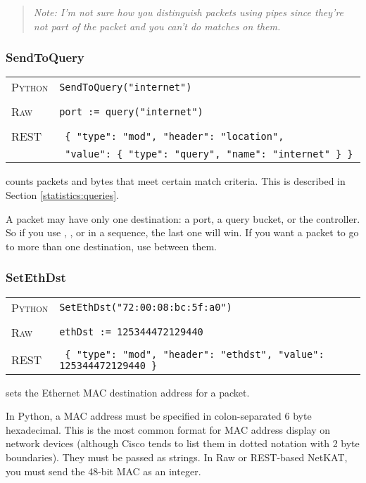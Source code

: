 \begin{quotation}
\emph{Note: I'm not sure how you distinguish packets using pipes since they're not part of the 
packet and you can't do matches on them.}
\end{quotation}

\subsubsection{SendToQuery}

\bigskip
\begin{tabularx}{\linewidth}{lX}
\textsc{Python}   & \texttt{SendToQuery("internet")} \\ \\
\textsc{Raw}    & \texttt{port := query("internet")}     \\ \\
\textsc{REST} & \texttt{ \{ "type": "mod", "header": "location", } \\
 & \texttt{ "value": \{ "type": "query", "name": "internet" \} \} } 
\end{tabularx}

 counts packets and bytes that meet certain match criteria.  This is described in
Section \ref{statistics:queries}.   

A packet may have only one destination: a port, a query bucket, or the controller.  So if you use 
, , or  in a sequence, the last one will
win.  If you want a packet to go to more than one destination, use  between them.    

\subsubsection{SetEthDst}

\bigskip
\begin{tabularx}{\linewidth}{lX}
\textsc{Python}   & \texttt{SetEthDst("72:00:08:bc:5f:a0")} \\ \\
\textsc{Raw}    & \texttt{ethDst := 125344472129440}     \\ \\
\textsc{REST} & \texttt{ \{ "type": "mod", "header": "ethdst", "value": 125344472129440 \} }
\end{tabularx}

 sets the Ethernet MAC destination address for a packet.    

In Python, a MAC address must be specified in colon-separated 6 byte hexadecimal.  This is the most common format
for MAC address display on network devices (although Cisco tends to list them in dotted notation with 2 byte
boundaries).  They must be passed as strings.  In Raw or REST-based NetKAT, you must send the 48-bit MAC as 
an integer.  

